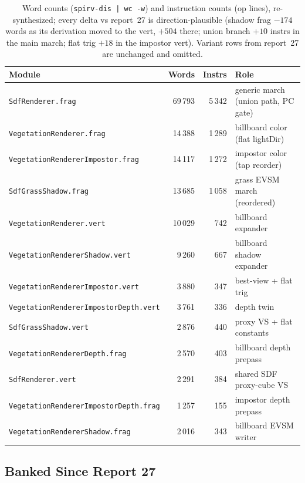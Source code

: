 \documentclass[11pt,a4paper]{article}
\begin{document}
\begin{table}[h]
\centering
\small
\begin{tabular}{@{}lrrl@{}}
\toprule
\textbf{Module} & \textbf{Words} & \textbf{Instrs} & \textbf{Role} \\
\midrule
\texttt{SdfRenderer.frag} & 69\,793 & 5\,342 & generic march (union path, PC gate) \\
\texttt{VegetationRenderer.frag} & 14\,388 & 1\,289 & billboard color (flat lightDir) \\
\texttt{VegetationRendererImpostor.frag} & 14\,117 & 1\,272 & impostor color (tap reorder) \\
\texttt{SdfGrassShadow.frag} & 13\,685 & 1\,058 & grass EVSM march (reordered) \\
\texttt{VegetationRenderer.vert} & 10\,029 & 742 & billboard expander \\
\texttt{VegetationRendererShadow.vert} & 9\,260 & 667 & billboard shadow expander \\
\texttt{VegetationRendererImpostor.vert} & 3\,880 & 347 & best-view + flat trig \\
\texttt{VegetationRendererImpostorDepth.vert} & 3\,761 & 336 & depth twin \\
\texttt{SdfGrassShadow.vert} & 2\,876 & 440 & proxy VS + flat constants \\
\texttt{VegetationRendererDepth.frag} & 2\,570 & 403 & billboard depth prepass \\
\texttt{SdfRenderer.vert} & 2\,291 & 384 & shared SDF proxy-cube VS \\
\texttt{VegetationRendererImpostorDepth.frag} & 1\,257 & 155 & impostor depth prepass \\
\texttt{VegetationRendererShadow.frag} & 2\,016 & 343 & billboard EVSM writer \\
\bottomrule
\end{tabular}
\caption{Word counts (\texttt{spirv-dis | wc -w}) and instruction counts
(op lines), re-synthesized; every delta vs report~27 is direction-plausible
(shadow frag $-174$ words as its derivation moved to the vert, $+504$
there; union branch $+10$ instrs in the main march; flat trig $+18$ in the
impostor vert). Variant rows from report~27 are unchanged and omitted.}
\end{table}

\subsection{Banked Since Report 27}
\label{sec:banked28}
\end{document}
